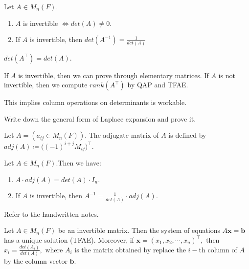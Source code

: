 \documentclass[12pt]{article}
\begin{document}
\begin{theorem}
Let $A\in M_n(F).$
\begin{enumerate}
    \item $A$ is invertible $\Longleftrightarrow det(A)\neq 0$.
    \item If $A$ is invertible, then $det(A^{-1})=\frac{1}{det(A)}$
\end{enumerate}
\label{thm_5.6}
\end{theorem}

\begin{theorem}
    $det(A^\top)=det(A).$
\end{theorem}
\begin{pf}
    If $A$ is invertible, then we can prove through elementary matrices.
    If $A$ is not invertible, then we compute $rank(A^\top)$ by QAP and TFAE.
\end{pf}
This implies column operations on determinants is workable.


\begin{exercise}
    Write down the general form of Laplace expansion and prove it.
\end{exercise}


\begin{definition}
    Let $A=(a_{ij}\in M_n(F)).$
    The adjugate matrix of $A$ is defined by $adj(A)\coloneq\big((-1)^{i+j}M_{ij}\big)^\top.$
\end{definition}


\begin{theorem}
     Let $A\in M_n(F)$.Then we have:
     \begin{enumerate}
        \item $A\cdot adj(A)=det(A)\cdot I_n.$
        \item If $A$ is invertible, then $A^{-1}=\frac{1}{det(A)}\cdot adj(A).$
     \end{enumerate}
\end{theorem}
\begin{pf}
    Refer to the handwritten notes.
\end{pf}

\begin{theorem}
    Let $A\in M_n(F)$ be an invertible matrix. Then the system of equations 
    $A\mathbf{x}=\mathbf{b}$ has a unique solution (TFAE).
    Moreover, if $\mathbf{x}=(x_1,x_2,\cdots,x_n)^\top,$ then $x_i=\frac{det(A_i)}{det(A)},$
    where $A_i$ is the matrix obtained by replace the $i-$th column of $A$ by the column vector $\mathbf{b}.$
\end{theorem}
\end{document}
